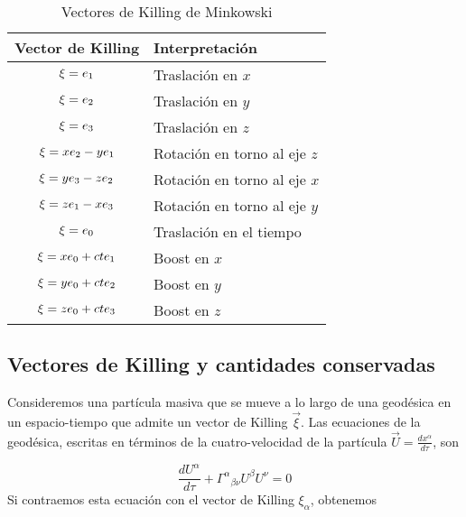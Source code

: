 \begin{table}[H]
\centering
\begin{tabular}{c|l}
\hline
\textbf{Vector de Killing} & \textbf{Interpretación} \\ \hline
$\mathbf{\xi}=e_1$ & Traslación en $x$ \\ \hline
$\mathbf{\xi}=e_2$ & Traslación en $y$ \\ \hline
$\mathbf{\xi}=e_3$ & Traslación en $z$ \\ \hline
$\mathbf{\xi}=x e_2-y e_1$ & Rotación en torno al eje $z$ \\ \hline
$\mathbf{\xi}=y e_3-z e_2$ & Rotación en torno al eje $x$ \\ \hline
$\mathbf{\xi}=z e_1-x e_3$ & Rotación en torno al eje $y$ \\ \hline
$\mathbf{\xi}=e_0$ & Traslación en el tiempo \\ \hline
$\mathbf{\xi}=x e_0+c t e_1$ & Boost en $x$ \\ \hline
$\mathbf{\xi}=y e_0+c t e_2$ & Boost en $y$ \\ \hline
$\mathbf{\xi}=z e_0+c t e_3$ & Boost en $z$ \\ \hline
\end{tabular}
\caption{Vectores de Killing de Minkowski}
\end{table}

\subsection{Vectores de Killing y cantidades conservadas}
Consideremos una partícula masiva que se mueve a lo largo de una geodésica en un espacio-tiempo que admite un vector de Killing $\vec{\xi}$. Las ecuaciones de la geodésica, escritas en términos de la cuatro-velocidad de la partícula $\vec{U}=\frac{d x^\alpha}{d \tau}$, son

\begin{equation}
\frac{d U^\alpha}{d \tau}+\Gamma^\alpha{ }_{\beta \nu} U^\beta U^\nu=0
\label{eq:geodesicaU}
\end{equation}
Si contraemos esta ecuación con el vector de Killing $\xi_\alpha$, obtenemos


